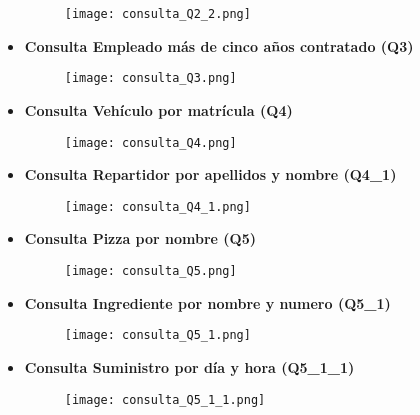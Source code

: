 \documentclass[a4paper]{article}
\begin{document}
\begin{itemize}
    \begin{figure}[H]
        \centering
        \texttt{[image: consulta\_Q2\_2.png]}
        \label{fig:consulta_Q2_2}
    \end{figure}

    \item \textbf{\large{Consulta Empleado más de cinco años contratado (Q3)}}

    \begin{figure}[H]
        \centering
        \texttt{[image: consulta\_Q3.png]}
        \label{fig:consulta_Q3}
    \end{figure}

\newpage

    \item \textbf{\large{Consulta Vehículo por matrícula (Q4)}}

    \begin{figure}[H]
        \centering
        \texttt{[image: consulta\_Q4.png]}
        \label{fig:consulta_Q4}
    \end{figure}

    \item \textbf{\large{Consulta Repartidor por apellidos y nombre (Q4\_1)}}

    \begin{figure}[H]
        \centering
        \texttt{[image: consulta\_Q4\_1.png]}
        \label{fig:consulta_Q4_1}
    \end{figure}

    \item \textbf{\large{Consulta Pizza por nombre (Q5)}}

    \begin{figure}[H]
        \centering
        \texttt{[image: consulta\_Q5.png]}
        \label{fig:consulta_Q5}
    \end{figure}

    \item \textbf{\large{Consulta Ingrediente por nombre y numero (Q5\_1)}}

    \begin{figure}[H]
        \centering
        \texttt{[image: consulta\_Q5\_1.png]}
        \label{fig:consulta_Q5_1}
    \end{figure}

\newpage

    \item \textbf{\large{Consulta Suministro por día y hora (Q5\_1\_1)}}

    \begin{figure}[H]
        \centering
        \texttt{[image: consulta\_Q5\_1\_1.png]}
        \label{fig:consulta_Q5_1_1}
    \end{figure}
        
\end{itemize}
\end{document}
